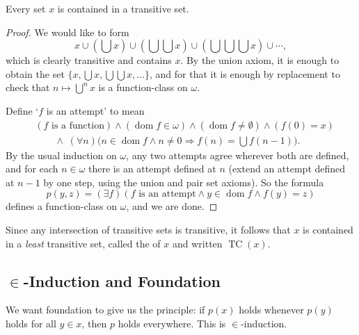 \documentclass[a4paper]{scrartcl}
\newcommand{\dom}{\operatorname{dom}}
\newcommand{\TC}{\operatorname{TC}}
\begin{document}
\begin{lemma}\label{lem:transclosure}
  Every set $x$ is contained in a transitive set.
\end{lemma}
\begin{proof}
  We would like to form
  $$
  x \cup \left(\bigcup x\right)\cup \left(\bigcup \bigcup x\right)\cup \left(\bigcup\bigcup\bigcup x\right)\cup \cdots,
  $$
  which is clearly transitive and contains $x$. By the union axiom, it is enough to obtain the set $\{x, \bigcup x, \bigcup\bigcup x, \dots\}$, and for that it is enough by replacement to check that $n \mapsto \bigcup^n x$ is a function-class on $\omega$.

  Define `$f$ is an attempt' to mean
  \begin{align*}
    &(f \text{ is a function}) \land (\dom f \in \omega) \land (\dom f \neq \emptyset) \land (f(0) = x) \\
    &\qquad \land \; (\forall n)\bigl(n \in \dom f \land n \neq 0 \Rightarrow f(n) = \textstyle\bigcup f(n-1)\bigr).
  \end{align*}
  By the usual induction on $\omega$, any two attempts agree wherever both are defined, and for each $n \in \omega$ there is an attempt defined at $n$ (extend an attempt defined at $n - 1$ by one step, using the union and pair set axioms). So the formula
  $$p(y, z) = (\exists f)(f \text{ is an attempt} \land y \in \dom f \land f(y) = z)$$
  defines a function-class on $\omega$, and we are done.
\end{proof}

Since any intersection of transitive sets is transitive, it follows that $x$ is contained in a \emph{least} transitive set, called the  of $x$ and written $\TC(x)$.

\subsection{\texorpdfstring{$\in$}{Epsilon}-Induction and Foundation}

We want foundation to give us the principle: if $p(x)$ holds whenever $p(y)$ holds for all $y \in x$, then $p$ holds everywhere. This is $\in$-induction.
\end{document}
